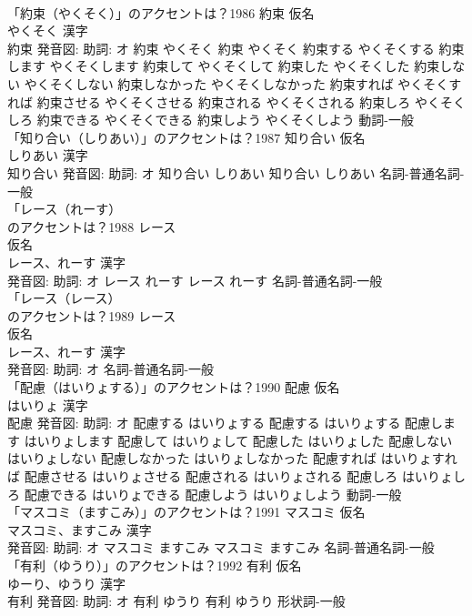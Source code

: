 \documentclass[8pt]{extreport}
\begin{document}
\begin{CJK}{UTF8}{min}
\\	「約束（やくそく）」のアクセントは？1986	約束 仮名　
\\	やくそく 漢字　
\\	約束 発音図: 助詞: オ	約束 やくそく		約束 やくそく 約束する やくそくする 約束します やくそくします 約束して やくそくして 約束した やくそくした 約束しない やくそくしない 約束しなかった やくそくしなかった 約束すれば やくそくすれば 約束させる やくそくさせる 約束される やくそくされる 約束しろ やくそくしろ 約束できる やくそくできる 約束しよう やくそくしよう				動詞-一般 
\\	「知り合い（しりあい）」のアクセントは？1987	知り合い 仮名　
\\	しりあい 漢字　
\\	知り合い 発音図: 助詞: オ	知り合い しりあい		知り合い しりあい				名詞-普通名詞-一般 
\\	「レース（れーす）
\\	のアクセントは？1988	レース
\\	仮名　
\\	レース、れーす 漢字　
\\	発音図: 助詞: オ	レース れーす		レース れーす				名詞-普通名詞-一般 
\\	「レース（レース）
\\	のアクセントは？1989	レース
\\	仮名　
\\	レース、れーす 漢字　
\\	発音図: 助詞: オ							名詞-普通名詞-一般 
\\	「配慮（はいりょする）」のアクセントは？1990	配慮 仮名　
\\	はいりょ 漢字　
\\	配慮 発音図: 助詞: オ	配慮する はいりょする		配慮する はいりょする 配慮します はいりょします 配慮して はいりょして 配慮した はいりょした 配慮しない はいりょしない 配慮しなかった はいりょしなかった 配慮すれば はいりょすれば 配慮させる はいりょさせる 配慮される はいりょされる 配慮しろ はいりょしろ 配慮できる はいりょできる 配慮しよう はいりょしよう				動詞-一般 
\\	「マスコミ（ますこみ）」のアクセントは？1991	マスコミ 仮名　
\\	マスコミ、ますこみ 漢字　
\\	発音図: 助詞: オ	マスコミ ますこみ		マスコミ ますこみ				名詞-普通名詞-一般 
\\	「有利（ゆうり）」のアクセントは？1992	有利 仮名　
\\	ゆーり、ゆうり 漢字　
\\	有利 発音図: 助詞: オ	有利 ゆうり		有利 ゆうり				形状詞-一般 

\end{CJK}
\end{document}

